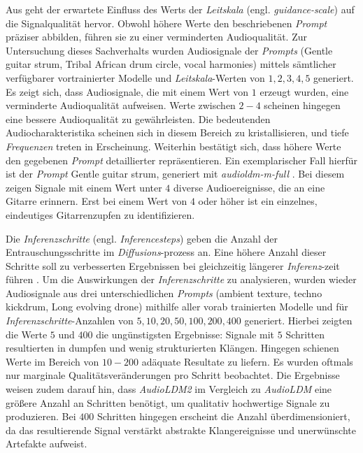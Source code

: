 \documentclass[
  a4paper,  %
  twoside,  %
  bibliography=totoc,
  headsepline,
  cleardoublepage=empty,
  parskip=half,
  draft=false
]{scrbook}
\begin{document}
Aus \cite{noauthor_huggingface-audioldm_nodate, noauthor_huggingface-audioldm2_nodate} geht der erwartete Einfluss des Werts der \emph{Leitskala} (engl. \emph{guidance-scale}) auf die Signalqualität hervor. Obwohl höhere Werte den beschriebenen \emph{Prompt} präziser abbilden, führen sie zu einer verminderten Audioqualität. Zur Untersuchung dieses Sachverhalts wurden Audiosignale der \emph{Prompts} (\glqq Gentle guitar strum, Tribal African drum circle, vocal harmonies\grqq) mittels sämtlicher verfügbarer vortrainierter Modelle und \emph{Leitskala}-Werten von $1,2,3,4,5$ generiert. Es zeigt sich, dass Audiosignale, die mit einem Wert von $1$ erzeugt wurden, eine verminderte Audioqualität aufweisen. Werte zwischen $2-4$ scheinen hingegen eine bessere Audioqualität zu gewährleisten. Die bedeutenden Audiocharakteristika scheinen sich in diesem Bereich zu kristallisieren, und tiefe \emph{Frequenzen} treten in Erscheinung. Weiterhin bestätigt sich, dass höhere Werte den gegebenen \emph{Prompt} detaillierter repräsentieren. Ein exemplarischer Fall hierfür ist der \emph{Prompt} \glqq Gentle guitar strum\grqq, generiert mit \emph{audioldm-m-full} \cite{noauthor_cvsspaudioldm-m-full_nodate}. Bei diesem zeigen Signale mit einem Wert unter $4$ diverse Audioereignisse, die an eine Gitarre erinnern. Erst bei einem Wert von $4$ oder höher ist ein einzelnes, eindeutiges Gitarrenzupfen zu identifizieren.

Die \emph{Inferenzschritte} (engl. \emph{Inferencesteps}) geben die Anzahl der Entrauschungsschritte im \emph{Diffusions}-prozess an. Eine höhere Anzahl dieser Schritte soll zu verbesserten Ergebnissen bei gleichzeitig längerer \emph{Inferenz}-zeit führen \cite{noauthor_huggingface-audioldm2_nodate, noauthor_huggingface-audioldm_nodate}. Um die Auswirkungen der \emph{Inferenzschritte} zu analysieren, wurden wieder Audiosignale aus drei unterschiedlichen \emph{Prompts} (\glqq ambient texture\grqq, \glqq techno kickdrum\grqq, \glqq Long evolving drone\grqq) mithilfe aller vorab trainierten Modelle und für \emph{Inferenzschritte}-Anzahlen von $5,10,20,50,100,200,400$ generiert. Hierbei zeigten die Werte $5$ und $400$ die ungünstigsten Ergebnisse: Signale mit $5$ Schritten resultierten in dumpfen und wenig strukturierten Klängen. Hingegen schienen Werte im Bereich von $10-200$ adäquate Resultate zu liefern. Es wurden oftmals nur marginale Qualitätsveränderungen pro Schritt beobachtet. Die Ergebnisse weisen zudem darauf hin, dass \emph{AudioLDM2} im Vergleich zu \emph{AudioLDM} eine größere Anzahl an Schritten benötigt, um qualitativ hochwertige Signale zu produzieren. Bei $400$ Schritten hingegen erscheint die Anzahl überdimensioniert, da das resultierende Signal verstärkt abstrakte Klangereignisse und unerwünschte Artefakte aufweist.
\end{document}
